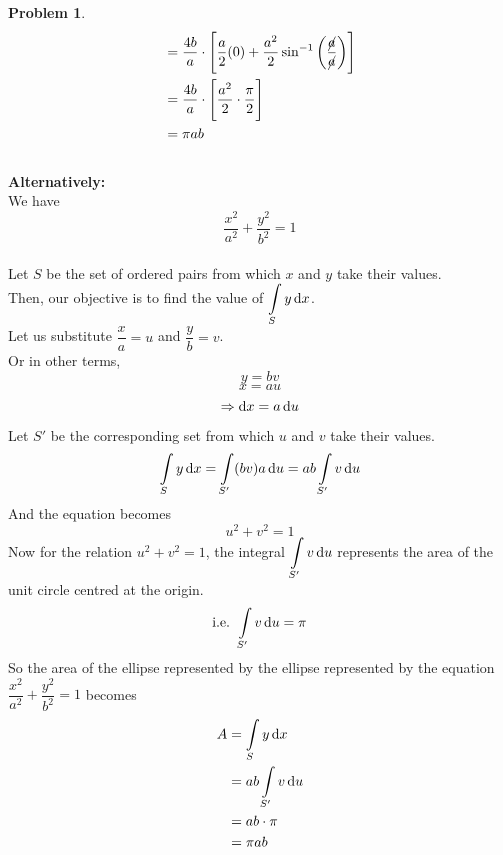 \documentclass[14]{article}
\theoremstyle{definition}
\newtheorem{prob}{Problem}
\theoremstyle{case}
\begin{document}
\begin{prob}
\begin{align*}
&= \dfrac{4b}{a} \cdot \left[ \dfrac{a}2 (0) + \dfrac{a^2}{2} \sin^{-1}\left( \dfrac{\cancel{a}}{\cancel{a}} \right) \right]\\
&= \dfrac{4b}{a} \cdot \left[ \dfrac{a^2}{2} \cdot \dfrac{\pi}{2} \right]\\
&= \pi a b
\end{align*}
\pagebreak
\text{}\\
\textbf{Alternatively:}\\
We have \[\dfrac{x^2}{a^2} + \dfrac{y^2}{b^2} = 1\]\\
Let $S$ be the set of ordered pairs from which $x$ and $y$ take their values.\\
Then, our objective is to find the value of $\displaystyle\int\limits_S y \dif x$.\\
Let us substitute $\dfrac{x}{a} = u$ and $\dfrac{y}{b} = v$.\\
Or in other terms,
\[y = bv\]
\[x = au\]
\[\Rightarrow \dif x = a \dif u\]
Let $S'$ be the corresponding set from which $u$ and $v$ take their values.\\
\[\int\limits_S y \dif x = \int\limits_{S'} (bv) a \dif u = ab \int\limits_{S'} v \dif u\]
And the equation becomes
\[u^2 + v^2 = 1\]
Now for the relation $u^2 + v^2 = 1$, the integral $\displaystyle\int\limits_{S'} v \dif u$ represents the area of the unit circle centred at the origin.\\
\[\text{i.e. } \int\limits_{S'} v \dif u = \pi\]
So the area of the ellipse represented by the ellipse represented by the equation $\dfrac{x^2}{a^2} + \dfrac{y^2}{b^2} = 1$ becomes
\begin{align*}
A &= \int\limits_{S} y \dif x\\
&= ab \int\limits_{S'} v \dif u\\
&= ab \cdot \pi\\
&= \pi ab
\end{align*}
\end{prob}
\pagebreak
\end{document}
